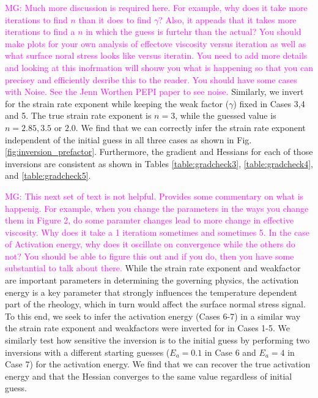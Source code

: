 \documentclass[12pt]{article}
\newcommand{\mgnote}[1]{\textcolor{magenta}{MG: #1}}
\begin{document}
\mgnote{Much more discussion is required here. For example, why does it take more iterations to find $n$ than it does to find $\gamma$? Also, it appeads that it takes more iterations to find a $n$ in which the guess is furtehr than the actual? You should make plots for your own analysis of effectove viscosity versus iteration as well as what surface noral stress looks like versus iteratin. You need to add more details and looking at this inofrmation will shouw you what is happening so that you can precisey and efficiently desribe this to the reader. You should have some cases with Noise. See the Jenn Worthen PEPI paper to see noise. }
Similarly, we invert for the strain rate exponent while keeping the weak factor ($\gamma$) fixed in Cases 3,4 and 5. The true strain rate exponent is $n=3$, while the guessed value is $n=2.85, 3.5$ or $2.0$. We find that we can correctly infer the strain rate exponent independent of the initial guess in all three cases as shown in Fig.\ref{fig:inversion_prefactor}. Furthermore, the gradient and Hessians for each of those inversions are consistent as shown in Tables \ref{table:gradcheck3}, \ref{table:gradcheck4}, and \ref{table:gradcheck5}.

\mgnote{This next set of text is not helpful. Provides some commentary on what is happenig. For example, when you change the parameters in the ways you change them in Figure 2, do some paramter changes lead to more change in effective viscosity. Why does it take a 1 iteratiom sometimes and sometimes 5. In the case of Activation energy, why does it oscillate on convergence while the others do not? You should be able to figure this out and if you do, then you have some substantial to talk about there. }
While the strain rate exponent and weakfactor are important parameters in determining the governing physics, the activation energy is a key parameter that strongly influences the temperature dependent part of the rheology, which in turn would affect the surface normal stress signal. To this end, we seek to infer the activation energy (Cases 6-7) in a similar way the strain rate exponent and weakfactors were inverted for in Cases 1-5.  We similarly test how sensitive the inversion is to the initial guess by performing two inversions with a different starting guesses ($E_a=0.1$ in Case 6 and $E_a = 4$ in Case 7) for the activation energy. We find that we can recover the true activation energy and that the Hessian converges to the same value regardless of initial guess.
\end{document}

